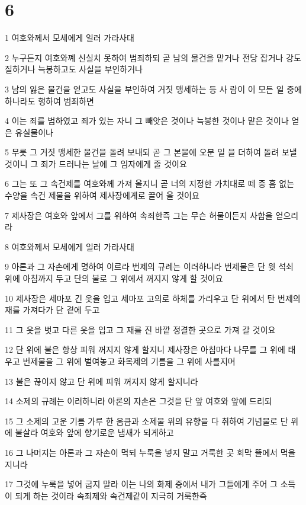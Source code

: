 \chapter{6}

\par 1 여호와께서 모세에게 일러 가라사대
\par 2 누구든지 여호와꼐 신실치 못하여 범죄하되 곧 남의 물건을 맡거나 전당 잡거나 강도질하거나 늑봉하고도 사실을 부인하거나
\par 3 남의 잃은 물건을 얻고도 사실을 부인하여 거짓 맹세하는 등 사 람이 이 모든 일 중에 하나라도 행하여 범죄하면
\par 4 이는 죄를 범하였고 죄가 있는 자니 그 빼앗은 것이나 늑봉한 것이나 맡은 것이나 얻은 유실물이나
\par 5 무릇 그 거짓 맹세한 물건을 돌려 보내되 곧 그 본물에 오분 일 을 더하여 돌려 보낼 것이니 그 죄가 드러나는 날에 그 임자에게 줄 것이요
\par 6 그는 또 그 속건제를 여호와께 가져 올지니 곧 너의 지정한 가치대로 떼 중 흠 없는 수양을 속건 제물을 위하여 제사장에게로 끌어 올 것이요
\par 7 제사장은 여호와 앞에서 그를 위하여 속죄한즉 그는 무슨 허물이든지 사함을 얻으리라
\par 8 여호와께서 모세에게 일러 가라사대
\par 9 아론과 그 자손에게 명하여 이르라 번제의 규례는 이러하니라 번제물은 단 윗 석쇠 위에 아침까지 두고 단의 불로 그 위에서 꺼지지 않게 할 것이요
\par 10 제사장은 세마포 긴 옷을 입고 세마포 고의로 하체를 가리우고 단 위에서 탄 번제의 재를 가져다가 단 곁에 두고
\par 11 그 옷을 벗고 다른 옷을 입고 그 재를 진 바깥 정결한 곳으로 가져 갈 것이요
\par 12 단 위에 불은 항상 피워 꺼지지 않게 할지니 제사장은 아침마다 나무를 그 위에 태우고 번제물을 그 위에 벌여놓고 화목제의 기름을 그 위에 사를지며
\par 13 불은 끊이지 않고 단 위에 피워 꺼지지 않게 할지니라
\par 14 소제의 규례는 이러하니라 아론의 자손은 그것을 단 앞 여호와 앞에 드리되
\par 15 그 소제의 고운 기름 가루 한 움큼과 소제물 위의 유향을 다 취하여 기념물로 단 위에 불살라 여호와 앞에 향기로운 냄새가 되게하고
\par 16 그 나머지는 아론과 그 자손이 먹되 누룩을 넣지 말고 거룩한 곳 회막 뜰에서 먹을지니라
\par 17 그것에 누룩을 넣어 굽지 말라 이는 나의 화제 중에서 내가 그들에게 주어 그 소득이 되게 하는 것이라 속죄제와 속건제같이 지극히 거룩한즉

